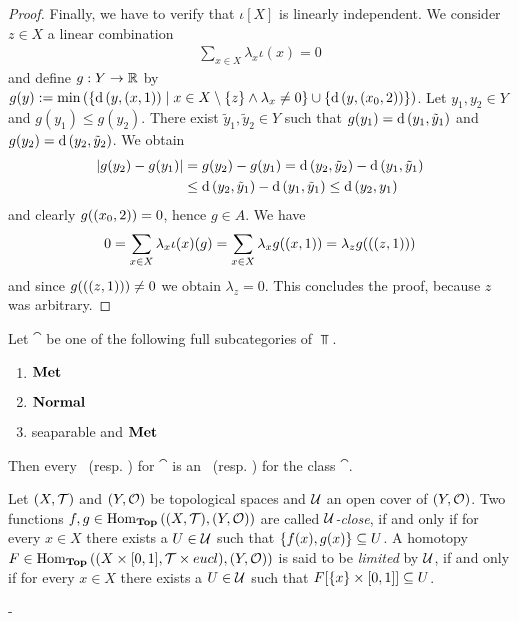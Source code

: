 \begin{proof}
	
	Finally, we have to verify that $\iota[X]$ is linearly independent. We consider $z \in X$ a linear combination 
	\begin{align*}
		\sum_{x \in X} \lambda_x \iota(x) = 0
	\end{align*}
	and define $g: Y \to \mathbb R$ by $g(y) := \min{\left ( {\left \{ \operatorname{d}{\left ( y, (x, 1) \right )} \mid x \in X \setminus \{z\} \land \lambda_x \neq 0 \right \}} \cup {\left \{ \operatorname{d}{\left ( y, {\left ( x_0, 2 \right )} \right )} \right \}} \right )}$. Let $y_1, y_2 \in Y$ and \Wlog $g(y_1) \leq g(y_2)$. There exist $\tilde{y}_1, \tilde{y}_2 \in Y$ such that $g(y_1) = \operatorname{d}{\left ( y_1, \tilde{y}_1 \right )}$ and $g(y_2) = \operatorname{d}{\left ( y_2, \tilde{y}_2 \right )}$. We obtain
	\begin{align*}
		{\left | g(y_2) - g(y_1) \right |} &= g(y_2) - g(y_1) = \operatorname{d}{\left ( y_2, \tilde{y}_2 \right )} - \operatorname{d}{\left ( y_1, \tilde{y}_1 \right )} \\
		&\leq \operatorname{d}{\left ( y_2, \tilde{y}_1 \right )} - \operatorname{d}{\left ( y_1, \tilde{y}_1 \right )} \leq \operatorname{d}{\left ( y_2, y_1 \right )}
	\end{align*}
	and clearly $g{\left ( {\left ( x_0, 2 \right )} \right )} = 0$, hence $g \in A$. We have
	\begin{align*}
		0 = \sum_{x \in X} \lambda_x \iota(x)(g) = \sum_{x \in X} \lambda_x g{\left ( {\left ( x, 1 \right )} \right )} = \lambda_z g({\left ( {\left ( z, 1 \right )} \right )})
	\end{align*}
	and since $g({\left ( {\left ( z, 1 \right )} \right )}) \neq 0$ we obtain $\lambda_z = 0$. This concludes the proof, because $z$ was arbitrary.  
\end{proof}

\begin{theorem}\cite[p. 84]{ToR} \label{theorem:anr_to_ane}
	Let $\cat$ be one of the following full subcategories of $\Top$.
	\begin{enumerate}
		\item $\mathbf{Met}$
		\item $\mathbf{Normal}$
		\item seaparable and $\mathbf{Met}$
	\end{enumerate}
	Then every \anr\ (resp. \ar) for $\cat$ is an \ane\ (resp. \aex) for the class $\cat$. 
\end{theorem}

\begin{definition}
	Let $\tspace$ and $\tspace[Y][O]$ be topological spaces and $\mathcal{U}$ an open cover of $\tspace[Y][O]$. Two functions $f,g \in \Hom_\Top\pbraces{\tspace, \tspace[Y][O]}$ are called $\mathcal{U}$\textit{-close}, if and only if for every $x \in X$ there exists a $U \in \mathcal{U}$ such that ${\left \{ f(x), g(x) \right \}} \subseteq U$. A homotopy $F \in \Hom_\Top\pbraces{\prodtspace, \tspace[Y][O]}$ is said to be \textit{limited} by $\mathcal{U}$, if and only if for every $x \in X$ there exists a $U \in \mathcal{U}$ such that $F{\left [ {\left \{ x \right \}} \times {\left [ 0, 1 \right ]} \right ]} \subseteq U$. 
\end{definition}

\begin{theorem}
	-
\end{theorem}